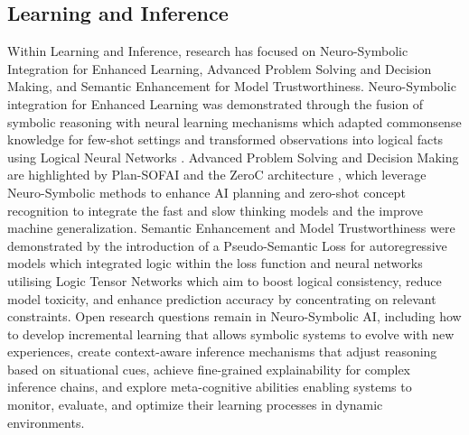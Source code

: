 \documentclass[hf]{ceurart}
\begin{document}
\subsection{Learning and Inference}\label{subsec:disc_learn}
Within Learning and Inference, research has focused on Neuro-Symbolic Integration for Enhanced Learning, Advanced Problem Solving and Decision Making, and Semantic Enhancement for Model Trustworthiness. Neuro-Symbolic integration for Enhanced Learning was demonstrated through the fusion of symbolic reasoning with neural learning mechanisms which adapted commonsense knowledge for few-shot settings and transformed observations into logical facts using Logical Neural Networks \cite{Da2021, Kimura2021}. Advanced Problem Solving and Decision Making are highlighted by Plan-SOFAI \cite{Fabiano2023} and the ZeroC architecture \cite{Wu2022a}, which leverage Neuro-Symbolic methods to enhance AI planning and zero-shot concept recognition to integrate the fast and slow thinking models and the improve machine generalization. Semantic Enhancement and Model Trustworthiness were demonstrated by the introduction of a Pseudo-Semantic Loss for autoregressive models which integrated logic within the loss function \cite{Ahmed2023} and neural networks utilising Logic Tensor Networks \cite{Badreddine2022} which aim to boost logical consistency, reduce model toxicity, and enhance prediction accuracy by concentrating on relevant constraints. Open research questions remain in Neuro-Symbolic AI, including how to develop incremental learning that allows symbolic systems to evolve with new experiences, create context-aware inference mechanisms that adjust reasoning based on situational cues, achieve fine-grained explainability for complex inference chains, and explore meta-cognitive abilities enabling systems to monitor, evaluate, and optimize their learning processes in dynamic environments.
\end{document}
